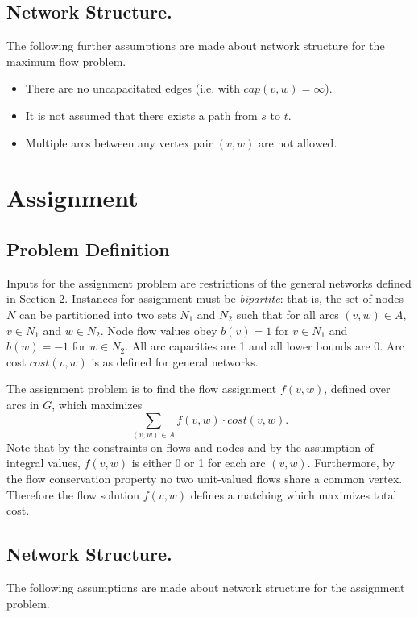 \subsection{Network Structure.}

The following further assumptions are made about network structure for
the maximum flow problem.

\begin{itemize}
\item There are no uncapacitated edges (i.e. with  $cap(v,w) = \infty$). 

\item It is not assumed that there exists a path from $s$ to $t$.

\item Multiple arcs between any vertex pair $(v,w)$ are not allowed.  

\end{itemize} 

\section{Assignment} 

\subsection{Problem Definition} 

Inputs for the assignment problem are restrictions of the general
networks defined in Section 2.  Instances for assignment must be {\em
bipartite}: that is, the set of nodes $N$ can be partitioned into two
sets $N_1$ and $N_2$ such that for all arcs $(v,w) \in A$, $v \in N_1$
and $w \in N_2$.  Node flow values obey $b(v) = 1$ for $v \in N_1$ and
$b(w) = -1$ for $w \in N_2$.  All arc capacities are 1 and all lower
bounds are 0.  Arc cost $cost(v,w)$ is as defined for general
networks.

The assignment problem is to find the flow assignment $f(v,w)$, defined
over arcs in $G$, which
maximizes
\[
\sum_{(v,w) \in A} f(v,w) \cdot cost(v,w).
\]
Note that by the constraints on flows and nodes and by the assumption
of integral values, $f(v,w)$ is either 0 or 1 for each arc $(v,w)$.
Furthermore, by the flow conservation property no two unit-valued
flows share a common vertex.  Therefore the flow solution $f(v,w)$
defines a matching which maximizes total cost.

\subsection{Network Structure.} 
The following assumptions are made about network structure for the
assignment problem.

